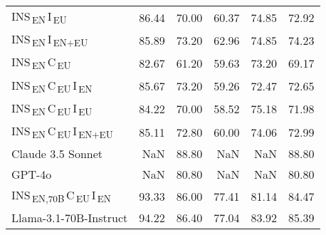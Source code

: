 \begin{tabular}{lrrrrr}
INS\textsubscript{\,EN}\,I\textsubscript{\,EU} & 86.44 & 70.00 & 60.37 & 74.85 & 72.92 \\
INS\textsubscript{\,EN}\,I\textsubscript{\,EN+EU} & 85.89 & 73.20 & 62.96 & 74.85 & 74.23 \\
INS\textsubscript{\,EN}\,C\textsubscript{\,EU} & 82.67 & 61.20 & 59.63 & 73.20 & 69.17 \\
INS\textsubscript{\,EN}\,C\textsubscript{\,EU}\,I\textsubscript{\,EN} & 85.67 & 73.20 & 59.26 & 72.47 & 72.65 \\
INS\textsubscript{\,EN}\,C\textsubscript{\,EU}\,I\textsubscript{\,EU} & 84.22 & 70.00 & 58.52 & 75.18 & 71.98 \\
INS\textsubscript{\,EN}\,C\textsubscript{\,EU}\,I\textsubscript{\,EN+EU} & 85.11 & 72.80 & 60.00 & 74.06 & 72.99 \\
Claude 3.5 Sonnet & NaN & 88.80 & NaN & NaN & 88.80 \\
GPT-4o & NaN & 80.80 & NaN & NaN & 80.80 \\
INS\textsubscript{\,EN,70B}\,C\textsubscript{\,EU}\,I\textsubscript{\,EN} & 93.33 & 86.00 & 77.41 & 81.14 & 84.47 \\
Llama-3.1-70B-Instruct & 94.22 & 86.40 & 77.04 & 83.92 & 85.39 \\
\bottomrule
\end{tabular}
